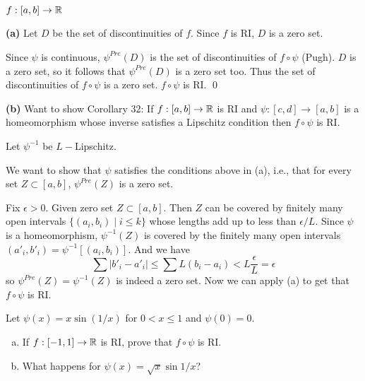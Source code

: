 \documentclass[a4paper, 12pt]{article}
\begin{document}
\begin{solution}
    $f: [a, b] \to \mathbb{R}$

    \textbf{(a)} Let $D$ be the set of discontinuities of $f$. Since $f$ is RI, $D$ is a zero set.

    Since $\psi$ is continuous, $\psi^{Pre}(D)$ is the set of discontinuities of $f \circ \psi$ (Pugh). $D$ is a zero set, so it follows that $\psi^{Pre}(D)$ is a zero set too. Thus the set of discontinuities of $f \circ \psi$ is a zero set. $f \circ \psi$ is RI. \qed

    \textbf{(b)} Want to show Corollary 32: If $f: [a, b] \to \mathbb{R}$ is RI and $\psi: [c, d] \to [a, b]$ is a homeomorphism whose inverse satisfies a Lipschitz condition then $f \circ \psi$ is RI.

    Let $\psi^{-1}$ be $L-$Lipschitz.

    We want to show that $\psi$ satisfies the conditions above in (a), i.e., that for every set $Z \subset [a, b]$, $\psi^{Pre}(Z)$ is a zero set.

    Fix $\epsilon > 0$. Given zero set $Z \subset [a, b]$. Then $Z$ can be covered by finitely many open intervals $\{(a_i, b_i) \mid i \leq k\}$ whose lengths add up to less than $\epsilon / L$. Since $\psi$ is a homeomorphism, $\psi^{-1}(Z)$ is covered by the finitely many open intervals $(a'_i, b'_i) = \psi^{-1}[(a_i, b_i)]$. And we have \[
        \sum |b'_i - a'_i| \leq \sum L(b_i - a_i) < L \frac{\epsilon}{L} = \epsilon
    \]
    so $\psi^{Pre}(Z) = \psi^{-1}(Z)$ is indeed a zero set. Now we can apply (a) to get that $f \circ \psi$ is RI.
\end{solution}
\begin{problem} 
Let $\psi(x) = x \sin (1/x)$ for $0 < x \leq 1$ and $\psi(0) = 0$.
\begin{enumerate} [(a)]
    \item If $f: [-1, 1] \to \mathbb{R}$ is RI, prove that $f \circ \psi$ is RI.
    \item What happens for $\psi(x) = \sqrt{x} \sin 1/x$?
\end{enumerate}
\end{problem}
\end{document}
